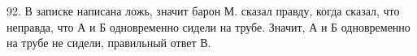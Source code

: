 92. В записке написана ложь, значит барон М. сказал правду, когда сказал, что неправда, что А и Б одновременно сидели на трубе. Значит, А и Б одновременно на трубе не сидели, правильный ответ В.\\
